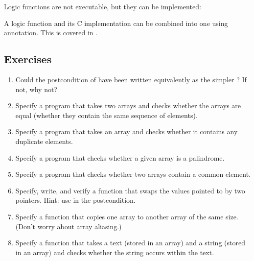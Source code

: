 Logic functions are not executable, but they can be implemented:

A logic function and its C implementation can be combined into one using
 annotation.  This is covered in .
 
\subsection{Exercises}
\begin{enumerate}
\item
Could the postcondition of  have been written equivalently
as the simpler ? If not, why not?
\item
Specify a program that takes two arrays and checks whether
the arrays are equal (\ie whether they contain the same sequence of
elements).
\item
Specify a program that takes an array and checks whether it
contains any duplicate elements.
\item
Specify a program that checks whether a given array
is a palindrome.
\item
Specify a program that checks whether two arrays contain a
common element.
\item
Specify, write, and verify a function that swaps the values pointed to
by two  pointers. Hint: use  in the
postcondition.
\item
Specify a function that copies one array to another array of the same
size. (Don't worry about array aliasing.)
\item 
Specify a function that takes a text (stored in an array) and a string
(stored in an array) and checks whether the string occurs within the
text.
\end{enumerate}



